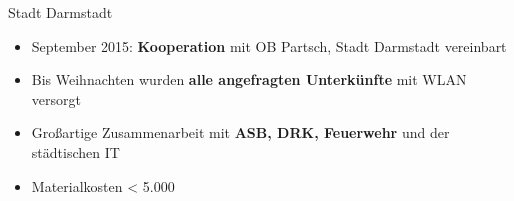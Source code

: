 \documentclass[t]{beamer}
\begin{document}
  \begin{frame}{Stadt Darmstadt}
    \begin{itemize}
      \item September 2015: \textbf{Kooperation} mit OB Partsch, Stadt Darmstadt vereinbart
      \item Bis Weihnachten wurden \textbf{alle angefragten Unterkünfte} mit WLAN versorgt
      \item Großartige Zusammenarbeit mit \textbf{ASB, DRK, Feuerwehr} und der städtischen IT
      \item Materialkosten < 5.000 \texteuro
    \end{itemize}
  \end{frame}

\end{document}
